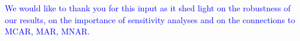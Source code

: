 \documentclass{article}
\begin{document}
\bigskip








\bigskip

\textcolor{blue}{We would like to thank you for this input as it shed light on the robustness of our results, on the importance of sensitivity analyses and on the connections to MCAR, MAR, MNAR.}
\end{document}
